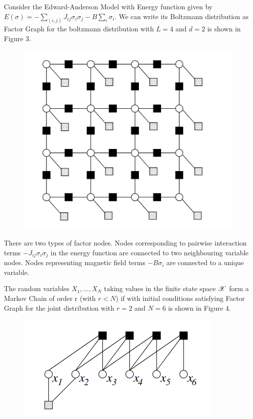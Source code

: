 \documentclass[letterpaper,english,10pt]{article}
\begin{document}
\begin{exmp}
Consider the Edward-Anderson Model with Energy function given by $E(\sigma) = -\sum_{(i,j)}J_{ij}\sigma_i\sigma_j - B\sum_i\sigma_i$.
We can write its Boltzmann distribution as 
Factor Graph for the boltzmann distribution with $L=4$ and $d=2$ is shown in Figure 3.
\begin{figure}[htb]
\centering
\includegraphics[width=0.25\linewidth]{exmpl_2.png}
\end{figure}
\newline
There are two types of factor nodes. Nodes corresponding to pairwise interaction terms $-J_{ij}\sigma_i\sigma_j$ in the energy function are
connected to two neighbouring variable nodes. Nodes representing magnetic field terms $-B\sigma_i$ are connected to a unique variable.
\end{exmp}

\begin{exmp}
The random variables $X_1,\dots,X_N$ taking values in the finite state space $\mathscr{X}$ form a Markov Chain of order r (with $r<N$) if
 with initial conditions satisfying
Factor Graph for the joint distribution with $r=2$ and $N=6$ is shown in Figure 4.
\begin{figure}[htb]
\centering
\includegraphics[width=0.25\linewidth]{exmpl_3.png}
\end{figure}
\end{exmp}
\end{document}
